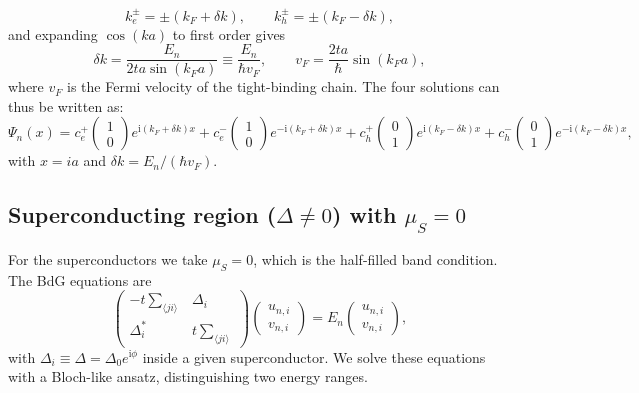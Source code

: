 \documentclass[11pt,a4paper,twoside,openany]{report}
\begin{document}
\[
  k_e^\pm = \pm (k_F + \delta k), \qquad
  k_h^\pm = \pm (k_F - \delta k),
\]
and expanding $\cos(k a)$ to first order gives
\[
  \delta k = \frac{E_n}{2 t a \sin(k_F a)} \equiv \frac{E_n}{\hbar v_F},
  \qquad v_F = \frac{2 t a}{\hbar} \sin(k_F a),
\]
where $v_F$ is the Fermi velocity of the tight-binding chain.  The four solutions can thus be written as:
\begin{equation}
  \boxed{
  \Psi_{n}(x) = c_e^+ \begin{pmatrix} 1 \\ 0 \end{pmatrix} e^{\mathrm{i}(k_F + \delta k)x}
              + c_e^- \begin{pmatrix} 1 \\ 0 \end{pmatrix} e^{-\mathrm{i}(k_F + \delta k)x}
              + c_h^+ \begin{pmatrix} 0 \\ 1 \end{pmatrix} e^{\mathrm{i}(k_F - \delta k)x}
              + c_h^- \begin{pmatrix} 0 \\ 1 \end{pmatrix} e^{-\mathrm{i}(k_F - \delta k)x},
  }
  \label{eq:Psi_N_linear}
\end{equation}
with $x = i a$ and $\delta k = E_n/(\hbar v_F)$.

\subsection{Superconducting region ($\Delta \neq 0$) with $\mu_S = 0$}
\label{sec:gen_sol_superconducting}
For the superconductors we take $\mu_S = 0$, which is the half-filled band condition.  The BdG equations are
\begin{equation}
  \begin{pmatrix}
    -t\sum_{\langle ji\rangle} & \Delta_i \\
    \Delta_i^* & t\sum_{\langle ji\rangle}
  \end{pmatrix}
  \begin{pmatrix} u_{n,i} \\ v_{n,i} \end{pmatrix}
  = E_n \begin{pmatrix} u_{n,i} \\ v_{n,i} \end{pmatrix},
  \label{eq:S_eq}
\end{equation}
with $\Delta_i \equiv \Delta = \Delta_0 e^{\mathrm{i}\phi}$ inside a given superconductor.  We solve these equations with a Bloch-like ansatz, distinguishing two energy ranges.
\end{document}
